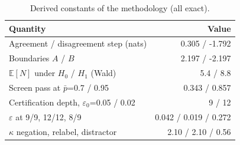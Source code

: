 \begin{table}[t]
\centering
\small
\begin{tabular}{lr}
\toprule
Quantity & Value \\
\midrule
Agreement / disagreement step (nats) & 0.305 / -1.792 \\
Boundaries $A$ / $B$ & 2.197 / -2.197 \\
$\mathbb{E}[N]$ under $H_0$ / $H_1$ (Wald) & 5.4 / 8.8 \\
Screen pass at $\bar p$=0.7 / 0.95 & 0.343 / 0.857 \\
Certification depth, $\varepsilon_0$=0.05 / 0.02 & 9 / 12 \\
$\varepsilon$ at 9/9, 12/12, 8/9 & 0.042 / 0.019 / 0.272 \\
$\kappa$ negation, relabel, distractor & 2.10 / 2.10 / 0.56 \\
\bottomrule
\end{tabular}
\caption{Derived constants of the methodology (all exact).}
\label{tab:theory}
\end{table}
